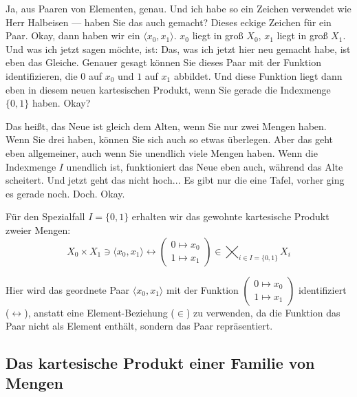 \begin{spoken-clean}[continued]
Ja, aus Paaren von Elementen, genau. Und ich habe so ein Zeichen verwendet wie Herr Halbeisen --- haben Sie das auch gemacht? Dieses eckige Zeichen für ein Paar. Okay, dann haben wir ein $\langle x_0, x_1 \rangle$. $x_0$ liegt in groß $X_0$, $x_1$ liegt in groß $X_1$. Und was ich jetzt sagen möchte, ist: Das, was ich jetzt hier neu gemacht habe, ist eben das Gleiche. Genauer gesagt können Sie dieses Paar mit der Funktion identifizieren, die $0$ auf $x_0$ und $1$ auf $x_1$ abbildet. Und diese Funktion liegt dann eben in diesem neuen kartesischen Produkt, wenn Sie gerade die Indexmenge $\{0, 1\}$ haben. Okay?

Das heißt, das Neue ist gleich dem Alten, wenn Sie nur zwei Mengen haben. Wenn Sie drei haben, können Sie sich auch so etwas überlegen. Aber das geht eben allgemeiner, auch wenn Sie unendlich viele Mengen haben. Wenn die Indexmenge $I$ unendlich ist, funktioniert das Neue eben auch, während das Alte scheitert. Und jetzt geht das nicht hoch... Es gibt nur die eine Tafel, vorher ging es gerade noch. Doch. Okay.
\end{spoken-clean}

\begin{math-stroke}
Für den Spezialfall $I = \{0, 1\}$ erhalten wir das gewohnte kartesische Produkt zweier Mengen:
\[
X_0 \times X_1 \ni \langle x_0, x_1 \rangle \leftrightarrow \begin{pmatrix} 0 \mapsto x_0 \\ 1 \mapsto x_1 \end{pmatrix} \in \bigtimes_{i \in I=\{0,1\}} X_i
\]
\end{math-stroke}

\begin{ai-note}
Hier wird das geordnete Paar $\langle x_0, x_1 \rangle$ mit der Funktion $\begin{pmatrix} 0 \mapsto x_0 \\ 1 \mapsto x_1 \end{pmatrix}$ identifiziert ($\leftrightarrow$), anstatt eine Element-Beziehung ($\in$) zu verwenden, da die Funktion das Paar nicht als Element enthält, sondern das Paar repräsentiert.
\end{ai-note}

\subsection{Das kartesische Produkt einer Familie von Mengen}


